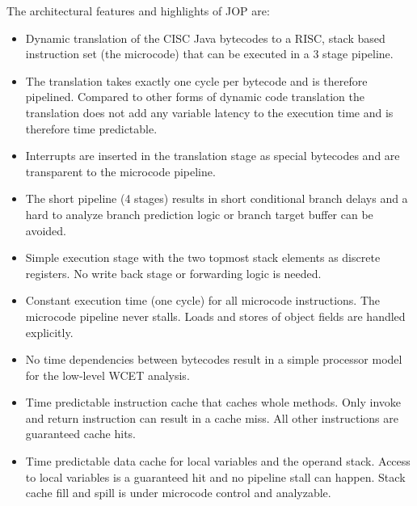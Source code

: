 The architectural features and highlights of JOP are:

\begin{itemize}

    \item Dynamic translation of the CISC Java bytecodes to a
        RISC, stack based instruction set (the microcode) that
        can be executed in a 3 stage pipeline.

    \item The translation takes exactly one cycle per bytecode
        and is therefore pipelined. Compared to other forms of
        dynamic code translation the translation does not add any
        variable latency to the execution time and is therefore
        time predictable.

    \item Interrupts are inserted in the translation stage as
        special bytecodes and are transparent to the microcode
        pipeline.

    \item The short pipeline (4 stages) results in short
        conditional branch delays and a hard to analyze branch
        prediction logic or branch target buffer can be avoided.

    \item Simple execution stage with the two topmost stack
        elements as discrete registers. No write back stage or
        forwarding logic is needed.

    \item Constant execution time (one cycle) for all microcode
        instructions. The microcode pipeline never stalls. Loads
        and stores of object fields are handled explicitly.

    \item No time dependencies between bytecodes result in a
        simple processor model for the low-level WCET analysis.

    \item Time predictable instruction cache that caches whole
        methods. Only invoke and return instruction can result in
        a cache miss. All other instructions are guaranteed cache
        hits.

    \item Time predictable data cache for local variables and the
        operand stack. Access to local variables is a guaranteed
        hit and no pipeline stall can happen. Stack cache fill
        and spill is under microcode control and analyzable.


\end{itemize}
